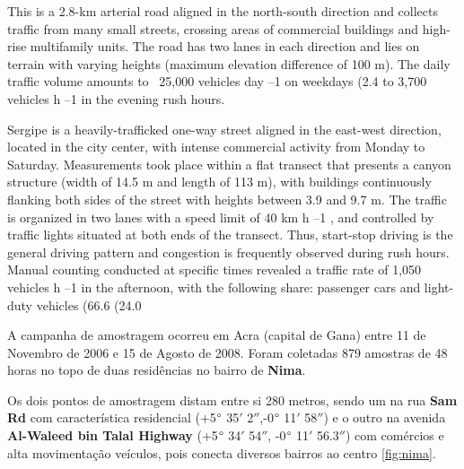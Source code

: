 This is a 2.8-km arterial road aligned in the north-south
direction and collects traffic from many small streets, crossing
areas of commercial buildings and high-rise multifamily units.
The road has two lanes in each direction and lies on terrain
with varying heights (maximum elevation difference of 100
m). The daily traffic volume amounts to ~25,000 vehicles day –1
on weekdays (2.4%
to 3,700 vehicles h –1 in the evening rush hours.

Sergipe is a heavily-trafficked one-way street aligned in
the east-west direction, located in the city center, with intense
commercial activity from Monday to Saturday. Measurements
took place within a flat transect that presents a canyon
structure (width of 14.5 m and length of 113 m), with
buildings continuously flanking both sides of the street with
heights between 3.9 and 9.7 m. The traffic is organized in
two lanes with a speed limit of 40 km h –1 , and controlled
by traffic lights situated at both ends of the transect. Thus,
start-stop driving is the general driving pattern and congestion
is frequently observed during rush hours. Manual counting
conducted at specific times revealed a traffic rate of 1,050
vehicles h –1 in the afternoon, with the following share:
passenger cars and light-duty vehicles (66.6%
(24.0%

A campanha de amostragem ocorreu em Acra (capital de Gana) 
entre 11 de Novembro de 2006 e 15 de Agosto de 2008. 
Foram coletadas 879 amostras de 48 horas no topo de duas residências 
no bairro de \textbf{Nima}.

Os dois pontos de amostragem distam entre si 280 metros, sendo um na rua
\textbf{Sam Rd} com característica residencial
(+5$\degree$ 35$'$ 2$''$,-0$\degree$ 11$'$ 58$''$)
e o outro na avenida \textbf{Al-Waleed bin Talal Highway} 
(+5$\degree$ 34$'$ 54$''$, -0$\degree$ 11$'$ 56.3$''$) com comércios e
alta movimentação veículos, pois conecta diversos bairros ao centro
\ref{fig:nima}. 

